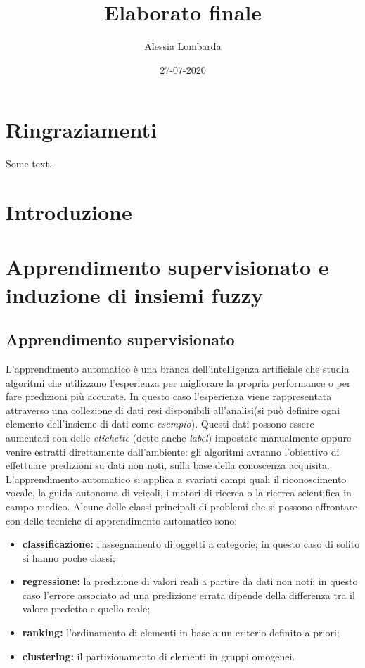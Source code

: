 \documentclass[oneside, openany]{book}
\title{Elaborato finale}
\date{27-07-2020}
\author{Alessia Lombarda}
\begin{document}
	\begin{titlepage}
		
	\end{titlepage}
	\frontmatter
	\chapter*{Ringraziamenti}
	Some text...
	\tableofcontents
	\mainmatter
	\chapter*{Introduzione}
		{} 
	\chapter{Apprendimento supervisionato e induzione di insiemi fuzzy}
		\section{Apprendimento supervisionato}
		L'apprendimento automatico è una branca dell'intelligenza artificiale che studia algoritmi che utilizzano l'esperienza per migliorare la propria performance o per fare predizioni più accurate. In questo caso l'esperienza viene rappresentata attraverso una collezione di dati resi disponibili all'analisi(si può definire ogni elemento dell'insieme di dati come \textit{esempio}). Questi dati possono essere aumentati con delle \textit{etichette} (dette anche \textit{label}) impostate manualmente oppure venire estratti direttamente dall'ambiente: gli algoritmi avranno l'obiettivo di effettuare predizioni su dati non noti, sulla base della conoscenza acquisita.
		L'apprendimento automatico si applica a svariati campi quali il riconoscimento vocale, la guida autonoma di veicoli, i motori di ricerca o la ricerca scientifica in campo medico. Alcune delle classi principali di problemi che si possono affrontare con delle tecniche di apprendimento automatico sono:
		\begin{itemize}
			\item\textbf{classificazione:} l'assegnamento di oggetti a categorie; in questo caso di solito si hanno poche classi;
			\item\textbf{regressione:} la predizione di valori reali a partire da dati non noti; in questo caso l'errore associato ad una predizione errata dipende della differenza tra il valore predetto e quello reale;
			\item\textbf{ranking:} l'ordinamento di elementi in base a un criterio definito a priori;
			\item\textbf{clustering:} il partizionamento di elementi in gruppi omogenei.
		\end{itemize}
	
\end{document}
